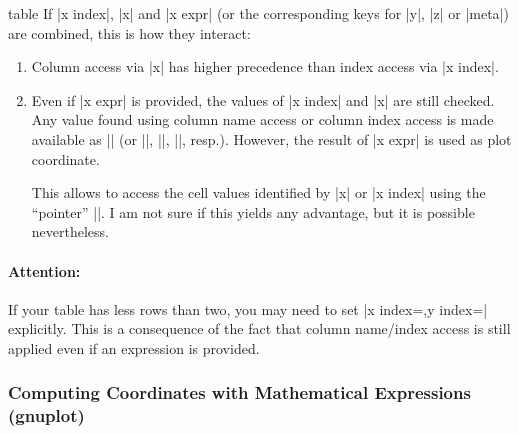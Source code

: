 \begin{addplotoperation}[]{table}{}
	If |x index|, |x| and |x expr| (or the corresponding keys for |y|, |z| or |meta|) are combined, this is how they interact:
	\begin{enumerate}
		\item Column access via |x| has higher precedence than index access via |x index|.
		\item Even if |x expr| is provided, the values of |x index| and |x| are still checked. Any value found using column name access or column index access is made available as |\x| (or |\y|, |\z|, |\meta|, resp.). However, the result of |x expr| is used as plot coordinate.

		This allows to access the cell values identified by |x| or |x index| using the ``pointer'' |\x|. I am not sure if this yields any advantage, but it is possible nevertheless.
	\end{enumerate}

	\paragraph{Attention:} If your table has less rows than two, you may need to set |x index={},y index={}| explicitly. This is a consequence of the fact that column name/index access is still applied even if an expression is provided.
\end{addplotoperation}

\subsubsection{Computing Coordinates with Mathematical Expressions (gnuplot)}

